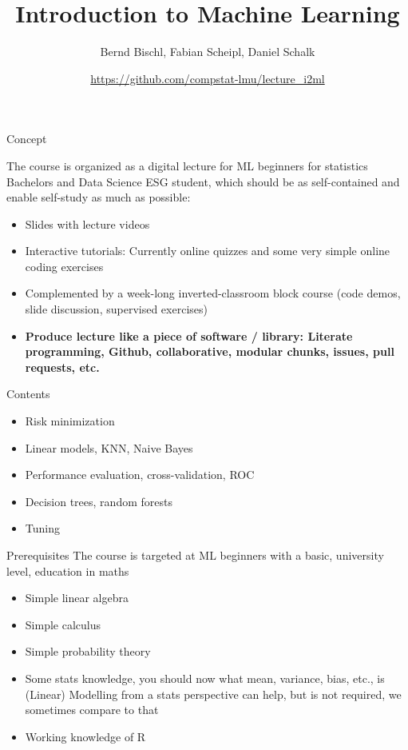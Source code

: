 \documentclass[10pt]{beamer}
\title{Introduction to Machine Learning}
\author{Bernd Bischl, Fabian Scheipl, Daniel Schalk\\}
\date{\url{https://github.com/compstat-lmu/lecture_i2ml}}
\begin{document}

\maketitle

\begin{frame}{Concept}

The course is organized as a digital lecture for ML beginners for statistics Bachelors and Data Science ESG student, which should be as self-contained and enable self-study as much as possible:

  \begin{itemize}
    \item
      Slides with lecture videos

    \item
      Interactive tutorials: Currently online quizzes and some very simple online 
      coding exercises

    \item
        Complemented by a week-long inverted-classroom block course 
            (code demos, slide discussion, supervised exercises)
    
        \item \textbf{Produce lecture like a piece of software / library: Literate programming, Github, collaborative, modular chunks, issues, pull requests, etc.}

  \end{itemize}
  

\end{frame}

\begin{frame}{Contents}

  \begin{itemize}
      \item Risk minimization
      \item Linear models, KNN, Naive Bayes
      \item Performance evaluation, cross-validation, ROC
      \item Decision trees, random forests
      \item Tuning
  \end{itemize}

\end{frame}

\begin{frame}{Prerequisites}
    The course is targeted at ML beginners with a basic, university level, education in maths
    \begin{itemize}
        \item Simple linear algebra
        \item Simple calculus
        \item Simple probability theory
        \item Some stats knowledge, you should now what mean, variance, bias, etc., is
            (Linear) Modelling from a stats perspective can help, but is not required, we sometimes compare to that
        \item Working knowledge of R
    \end{itemize}
\end{frame}
\end{document}
